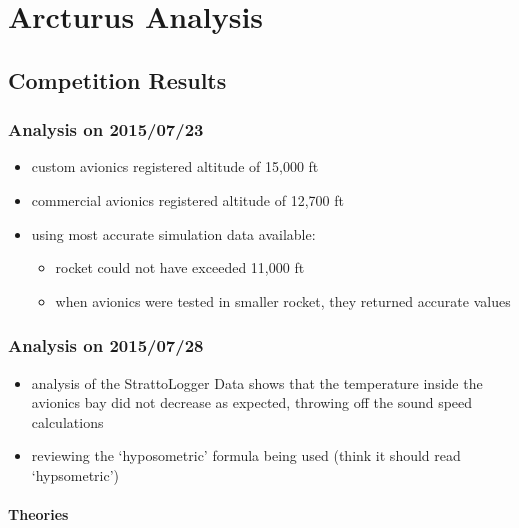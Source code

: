 \documentclass[]{article}
\providecommand{\tightlist}{%
  \setlength{\itemsep}{0pt}\setlength{\parskip}{0pt}}
\let\oldparagraph\paragraph
\renewcommand{\paragraph}[1]{\oldparagraph{#1}\mbox{}}
\begin{document}
\section{Arcturus Analysis}\label{arcturus-analysis}

\subsection{Competition Results}\label{competition-results}

\subsubsection{Analysis on 2015/07/23}\label{analysis-on-20150723}

\begin{itemize}
\tightlist
\item
  custom avionics registered altitude of 15,000 ft
\item
  commercial avionics registered altitude of 12,700 ft
\item
  using most accurate simulation data available:

  \begin{itemize}
  \tightlist
  \item
    rocket could not have exceeded 11,000 ft
  \item
    when avionics were tested in smaller rocket, they returned accurate
    values
  \end{itemize}
\end{itemize}

\subsubsection{Analysis on 2015/07/28}\label{analysis-on-20150728}

\begin{itemize}
\tightlist
\item
  analysis of the StrattoLogger Data shows that the temperature inside
  the avionics bay did not decrease as expected, throwing off the sound
  speed calculations
\item
  reviewing the `hyposometric' formula being used (think it should read
  `hypsometric')
\end{itemize}

\paragraph{Theories}\label{theories}
\end{document}
